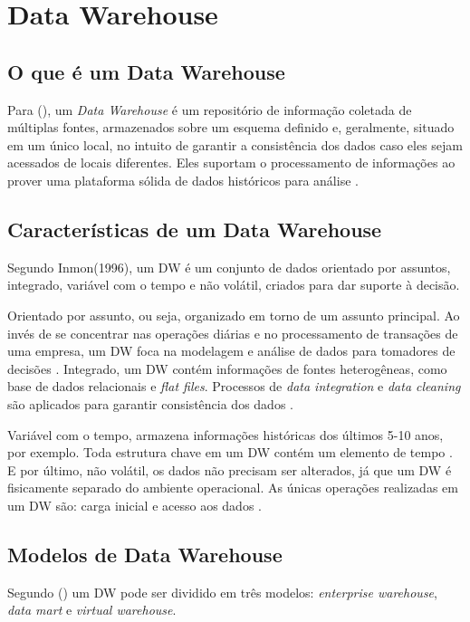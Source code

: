 \section{ Data Warehouse}
\subsection{O que é um Data Warehouse}
Para \citeauthor{jmj} (\citeyear{jmj}), um \textit{Data Warehouse} é um repositório de informação coletada de múltiplas fontes, armazenados sobre um esquema definido e, geralmente, situado em um único local, no intuito de garantir a consistência dos dados caso eles sejam acessados de locais diferentes. Eles suportam o processamento de informações ao prover uma plataforma sólida de dados históricos para análise \citep{jmj}.

\subsection{Características de um Data Warehouse}
Segundo Inmon(1996), um DW é um conjunto de dados orientado por assuntos, integrado, variável com o tempo e não volátil, criados para dar suporte à decisão.

Orientado por assunto, ou seja, organizado em torno de um assunto principal. Ao invés de se concentrar nas operações diárias e no processamento de transações de uma empresa, um DW foca na modelagem e análise de dados para tomadores de decisões \citep{jmj}.
Integrado, um DW contém informações de fontes heterogêneas, como base de dados relacionais e \textit{flat files}. Processos de \textit{data integration} e \textit{data cleaning} são aplicados para garantir consistência dos dados \citep{jmj}.

Variável com o tempo, armazena informações históricas dos últimos 5-10 anos, por exemplo. Toda estrutura chave em um DW contém um elemento de tempo \citep{jmj}.
E por último, não volátil, os dados não precisam ser alterados, já que um DW é fisicamente separado do ambiente operacional. As únicas operações realizadas em um DW são: carga inicial e acesso aos dados \citep{jmj}.

\subsection{Modelos de Data Warehouse}
Segundo \citeauthor{jmj} (\citeyear{jmj}) um DW pode ser dividido em três modelos: \textit{enterprise warehouse}, \textit{data mart} e \textit{virtual warehouse}.

